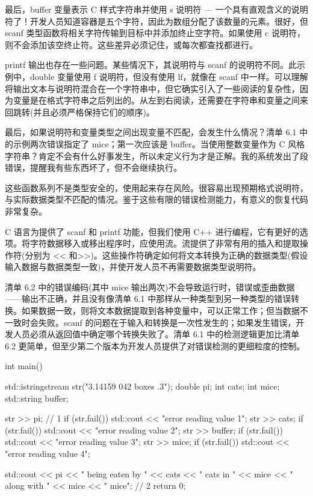 最后，buffer 变量表示 C 样式字符串并使用 s 说明符 — 一个具有直观含义的说明符了！开发人员知道容器是五个字符，因此为数组分配了该数量的元素。很好，但scanf 类型函数将相关字符传输到目标中并添加终止空字符。如果使用 c 说明符，则不会添加该空终止符。这些差异必须记住，或每次都查找都进行。

printf 输出也存在一些问题。某些情况下，其说明符与 scanf 的说明符不同。此示例中，double 变量使用 f 说明符，但没有使用 lf，就像在 scanf 中一样。可以理解将输出文本与说明符混合在一个字符串中，但它确实引入了一些阅读的复杂性，因为变量是在格式字符串之后列出的。从左到右阅读，还需要在字符串和变量之间来回跳转(并且必须严格保持它们的顺序)。

最后，如果说明符和变量类型之间出现变量不匹配，会发生什么情况？清单 6.1 中的示例两次错误指定了 mice；第一次应该是 buffer。当使用整数变量作为 C 风格字符串？肯定不会有什么好事发生，所以未定义行为才是正解。我的系统发出了段错误，提醒我有些东西坏了，但不会继续执行。

这些函数系列不是类型安全的，使用起来存在风险。很容易出现预期格式说明符，与实际数据类型不匹配的情况。鉴于这些有限的错误检测能力，有意义的恢复代码非常复杂。


C 语言为提供了 scanf 和 printf 功能，但我们使用 C++ 进行编程，它有更好的选项。将字符数据移入或移出程序时，应使用流。流提供了非常有用的插入和提取操作符(分别为 <{}< 和>{}>)。这些操作符确定如何将文本转换为正确的数据类型(假设输入数据与数据类型一致)，并使开发人员不再需要数据类型说明符。

清单 6.2 中的错误编码(其中 mice 输出两次)不会导致运行时，错误或歪曲数据——输出不正确，并且没有像清单 6.1 中那样从一种类型到另一种类型的错误转换。如果数据一致，则将文本数据提取到各种变量中，可以正常工作；但当数据不一致时会失败。scanf 的问题在于输入和转换是一次性发生的；如果发生错误，开发人员必须从返回值中确定哪个转换失败了。清单 6.1 中的检测逻辑更加比清单 6.2 更简单，但至少第二个版本为开发人员提供了对错误检测的更细粒度的控制。


\begin{cpp}
int main() {
  std::istringstream str("3.14159 042 boxes .3");
  double pi;
  int cats;
  int mice;
  std::string buffer;

  str >> pi; // 1
  if (str.fail())
    std::cout << "error reading value 1\n";
  str >> cats;
  if (str.fail())
    std::cout << "error reading value 2\n";
  str >> buffer;
  if (str.fail())
    std::cout << "error reading value 3\n";
  str >> mice;
  if (str.fail())
    std::cout << "error reading value 4\n";

  std::cout << pi << " being eaten by " << cats << " cats in " << mice
    << " along with " << mice << " mice\n"; // 2
  return 0;
}
\end{cpp}

